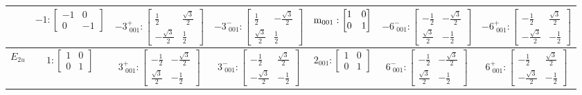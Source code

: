 \documentclass[fleqn,8pt,landscape]{jsarticle}
\begin{document}
\begin{longtable}{ccccccc}
& $ -1:\begin{bmatrix} -1 & 0 \\ 0 & -1 \end{bmatrix} $ & $ -3^{+}_{\,\,001}:\begin{bmatrix} \frac{1}{2} & \frac{\sqrt{3}}{2} \\ - \frac{\sqrt{3}}{2} & \frac{1}{2} \end{bmatrix} $ & $ -3^{-}_{\,\,001}:\begin{bmatrix} \frac{1}{2} & - \frac{\sqrt{3}}{2} \\ \frac{\sqrt{3}}{2} & \frac{1}{2} \end{bmatrix} $ & $ {\rm m}_{001}:\begin{bmatrix} 1 & 0 \\ 0 & 1 \end{bmatrix} $ & $ -6^{-}_{\,\,001}:\begin{bmatrix} - \frac{1}{2} & - \frac{\sqrt{3}}{2} \\ \frac{\sqrt{3}}{2} & - \frac{1}{2} \end{bmatrix} $ & $ -6^{+}_{\,\,001}:\begin{bmatrix} - \frac{1}{2} & \frac{\sqrt{3}}{2} \\ - \frac{\sqrt{3}}{2} & - \frac{1}{2} \end{bmatrix} $ \\ \hline
$ E_{2u} $ & $ 1:\begin{bmatrix} 1 & 0 \\ 0 & 1 \end{bmatrix} $ & $ 3^{+}_{\,\,001}:\begin{bmatrix} - \frac{1}{2} & - \frac{\sqrt{3}}{2} \\ \frac{\sqrt{3}}{2} & - \frac{1}{2} \end{bmatrix} $ & $ 3^{-}_{\,\,001}:\begin{bmatrix} - \frac{1}{2} & \frac{\sqrt{3}}{2} \\ - \frac{\sqrt{3}}{2} & - \frac{1}{2} \end{bmatrix} $ & $ 2{}_{001}:\begin{bmatrix} 1 & 0 \\ 0 & 1 \end{bmatrix} $ & $ 6^{-}_{\,\,001}:\begin{bmatrix} - \frac{1}{2} & - \frac{\sqrt{3}}{2} \\ \frac{\sqrt{3}}{2} & - \frac{1}{2} \end{bmatrix} $ & $ 6^{+}_{\,\,001}:\begin{bmatrix} - \frac{1}{2} & \frac{\sqrt{3}}{2} \\ - \frac{\sqrt{3}}{2} & - \frac{1}{2} \end{bmatrix} $ \\

\end{longtable}
\end{document}
